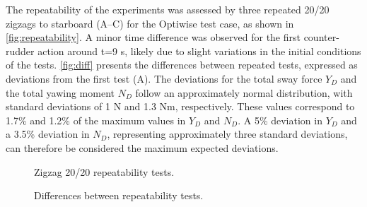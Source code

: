 \noindent The repeatability of the experiments was assessed by three repeated 20/20 zigzags to starboard (A--C) for the Optiwise test case, as shown in \autoref{fig:repeatability}. A minor time difference was observed for the first counter-rudder action around t=9 s, likely due to slight variations in the initial conditions of the tests. \autoref{fig:diff} presents the differences between repeated tests, expressed as deviations from the first test (A). The deviations for the total sway force $Y_D$ and the total yawing moment $N_D$ follow an approximately normal distribution, with standard deviations of 1 N and 1.3 Nm, respectively. These values correspond to 1.7\% and 1.2\% of the maximum values in $Y_D$ and $N_D$. A 5\% deviation in $Y_D$ and a 3.5\% deviation in $N_D$, representing approximately three standard deviations, can therefore be considered the maximum expected deviations.
\begin{figure}[h!]
    \centering   
    
    \caption{Zigzag 20/20 repeatability tests.}
    \label{fig:repeatability}
\end{figure}
\begin{figure}[h!]
    \centering   
    
    \caption{Differences between repeatability tests.}
    \label{fig:diff}
\end{figure}
%    
%
%    
